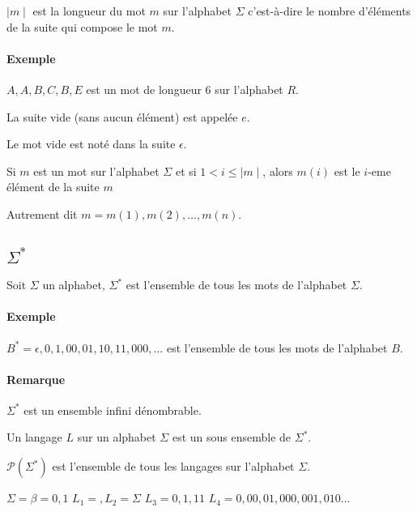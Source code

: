 \documentclass[12pt, a4paper]{report}
\begin{document}
$\mid m \mid$ est la longueur du mot $m$ sur l'alphabet $\Sigma$ c'est-à-dire le nombre d'éléments de
la suite qui compose le mot $m$.

\paragraph{Exemple}

$A, A, B, C, B, E$ est un mot de longueur $6$ sur l'alphabet $R$.

La suite vide (sans aucun élément) est appelée $e$.

Le mot vide est noté dans la suite $\epsilon$.

Si $m$ est un mot sur l'alphabet $\Sigma$ et si $1 < i \leq \mid m \mid$,
alors $m(i)$ est le $i$-eme élément de la suite $m$

Autrement dit $m = m(1), m(2), \dots, m(n)$.

\subsection{$\Sigma^{*}$}

Soit $\Sigma$ un alphabet, $\Sigma^{*}$ est l'ensemble de tous les mots de
l'alphabet $\Sigma$.

\paragraph{Exemple}

$B^{*} = { \epsilon, 0, 1, 00, 01, 10, 11, 000, \dots}$ est l'ensemble de tous
les mots de l'alphabet $B$. %

\paragraph{Remarque}
$\Sigma^{*}$ est un ensemble infini dénombrable.


Un langage $L$ sur un alphabet $\Sigma$ est un sous ensemble de $\Sigma^{*}$.

 $\mathcal{P} (\Sigma^{*}) $ est l'ensemble de tous les langages sur l'alphabet
 $\Sigma$.
 
 $\Sigma = \beta = {0,1}$
$L_1 = {}, L_2 = {\Sigma}$
$L_3 = {0,1,11}$
$L_4 = {0,00,01,000,001,010 ... }$

\subsection{}
\end{document}
